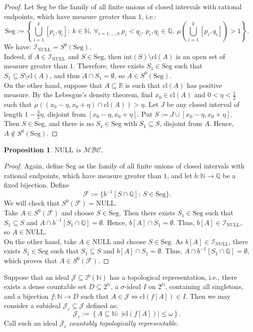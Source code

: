 \documentclass{amsart}
\newtheorem{prop}[thm]{Proposition}
\theoremstyle{definition}
\newcommand{\N}{{\mathbb N}}
\newcommand{\R}{{\mathbb R}}
\newcommand{\Q}{{\mathbb Q}}
\newcommand{\I}{\mathcal I}
\newcommand{\J}{\mathcal J}
\newcommand{\calF}{\mathcal{F}}
\newcommand{\MB}{S^0}
\newcommand{\MBC}{\mathcal{MBC}}
\newcommand{\Seg}{\mathrm{Seg}}
\newcommand{\NULL}{\mathrm{NULL}}
\newcommand{\INULL}{\I_\mathrm{NULL}}
\newcommand{\cl}{\mathrm{cl}}
\newcommand{\interior}{\mathrm{int}}
\begin{document}
\begin{proof}
Let $\Seg$ be the family of all finite unions of closed intervals with rational endpoints, which have measure greater than $1$, i.e.:
$$\Seg := \left\{\bigcup_{i=1}^{k}{[p_i,q_i]} :\ k\in\N,\ \forall_{i=1,\ldots,k}\ p_i<q_i,\ p_i,q_i\in\Q,\ \mu\left(\bigcup_{i=1}^{k}{[p_i,q_i]}\right)>1\right\}.$$
We have: $\INULL = \MB(\Seg)$.\\
Indeed, if $A \in \INULL$ and $S\in\Seg$, then $\interior(S) \setminus \cl(A)$ is an open set of measure greater than $1$. Therefore, there exists $S_1\in \Seg$ such that $S_1 \subseteq S \setminus \cl(A)$, and thus $A \cap S_1 =\emptyset$, so $A\in\MB(\Seg)$.\\
On the other hand, suppose that $A\subseteq \R$ is such that $\cl(A)$ has positive measure. By the Lebesgue's density theorem, find $x_0\in\cl(A)$ and $0 < \eta < \frac{1}{2}$ such that $\mu((x_0-\eta, x_0+\eta) \cap \cl(A)) > \eta$. Let $J$ be any closed interval of length $1 - \frac{3}{2}\eta$, disjoint from $[x_0-\eta, x_0+\eta]$. Put $S := J \cup [x_0-\eta, x_0+\eta]$. Then $S\in\Seg$, and there is no $S_1\in\Seg$ with $S_1 \subseteq S$, disjoint from $A$. Hence, $A\notin\MB(\Seg)$.
\end{proof}

\begin{prop}
$\NULL$ is $\MBC$.
\end{prop}

\begin{proof}
Again, define $\Seg$ as the family of all finite unions of closed intervals with rational endpoints, which have measure greater than $1$, and let $b\colon \N \to \Q$ be a fixed bijection.
Define 
$$\calF := \{b^{-1}[S\cap\Q] :\ S\in\Seg\}.$$
We will check that $\MB(\calF) = \NULL$.\\
Take $A\in \MB(\calF)$ and choose $S\in\Seg$. Then there exists $S_1\in\Seg$ such that $S_1\subseteq S$ and $A\cap b^{-1}[S_1\cap\Q] = \emptyset$. Hence, $b[A] \cap S_1 = \emptyset$. Thus, $b[A]\in\INULL$, so $A\in\NULL$.\\
On the other hand, take $A\in \NULL$ and choose $S\in\Seg$. As $b[A]\in\INULL$, there exists $S_1\in \Seg$ such that $S_1\subseteq S$ and $b[A]\cap S_1 = \emptyset$. Thus, $A \cap b^{-1}[S_1\cap\Q] = \emptyset$, which proves that $A\in \MB(\calF)$.
\end{proof}


Suppose that an ideal $\mathcal{J}\subseteq \mathcal{P}(\N)$ has a topological representation, i.e., there exists a dense countable set $D\subseteq 2^{\N}$, a $\sigma$-ideal $I$ on $2^{\N}$, containing all singletons, and a bijection $f\colon\N\to D$ such that $A\in\J \Leftrightarrow \cl(f[A])\in I$. Then we may consider a subideal $\J_c \subseteq \J$ defined as:
$$\J_c :=\left\{A\subseteq \N :\ |\cl(f[A])| \leq \omega\right\}.$$
Call such an ideal $\J_c$ \emph{countably topologically representable}.
\end{document}
